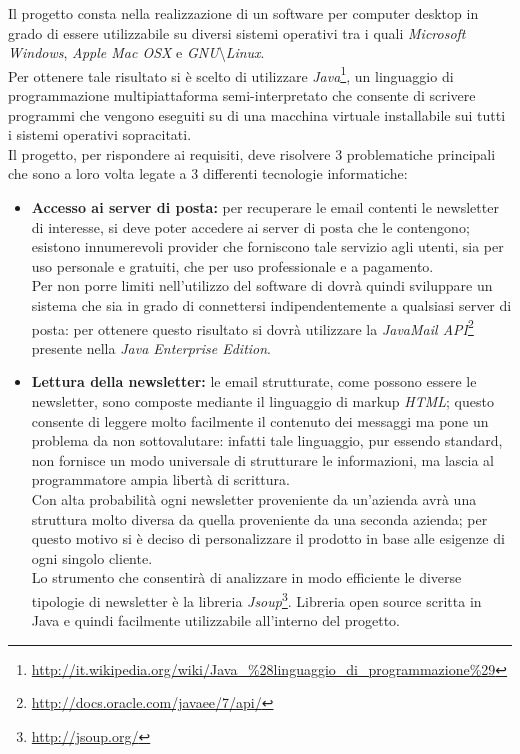 Il progetto consta nella realizzazione di un software per computer desktop in grado di essere utilizzabile su diversi sistemi operativi tra i quali \emph{Microsoft Windows}, \emph{Apple Mac OSX} e \emph{GNU}\textbackslash\emph{Linux}.\\
Per ottenere tale risultato si è scelto di utilizzare \emph{Java}\footnote{\url{http://it.wikipedia.org/wiki/Java\_\%28linguaggio\_di\_programmazione\%29}}, un linguaggio di programmazione multipiattaforma semi-interpretato che consente di scrivere programmi che vengono eseguiti su di una macchina virtuale installabile sui tutti i sistemi operativi sopracitati.\\
Il progetto, per rispondere ai requisiti, deve risolvere 3 problematiche principali che sono a loro volta legate a 3 differenti tecnologie informatiche:
\begin{itemize}
\item \textbf{Accesso ai server di posta:} per recuperare le email contenti le newsletter di interesse, si deve poter accedere ai server di posta che le contengono; esistono innumerevoli provider che forniscono tale servizio agli utenti, sia per uso personale e gratuiti, che per uso professionale e a pagamento.\\
Per non porre limiti nell'utilizzo del software di dovrà quindi sviluppare un sistema che sia in grado di connettersi indipendentemente a qualsiasi server di posta: per ottenere questo risultato si dovrà utilizzare la \emph{JavaMail API}\footnote{\url{http://docs.oracle.com/javaee/7/api/}} presente  nella \emph{Java Enterprise Edition}.
\item \textbf{Lettura della newsletter:} le email strutturate, come possono essere le newsletter, sono composte mediante il linguaggio di markup \emph{HTML}; questo consente di leggere molto facilmente il contenuto dei messaggi ma pone un problema da non sottovalutare: infatti tale linguaggio, pur essendo standard, non fornisce un modo universale di strutturare le informazioni, ma lascia al programmatore ampia libertà di scrittura.\\
Con alta probabilità ogni newsletter proveniente da un'azienda avrà una struttura molto diversa da quella proveniente da una seconda azienda; per questo motivo si è deciso di personalizzare il prodotto in base alle esigenze di ogni singolo cliente.\\
Lo strumento che consentirà di analizzare in modo efficiente le diverse tipologie di newsletter è la libreria \emph{Jsoup}\footnote{\url{http://jsoup.org/}}. Libreria open source scritta in Java e quindi facilmente utilizzabile all'interno del progetto.

\end{itemize}
